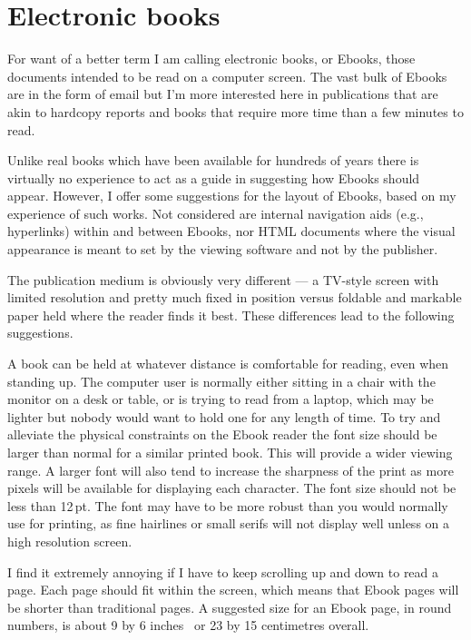 \documentclass[10pt,a4paper,oneside,extrafontsizes]{memoir}%
\newcommand\U[2]{\textrm{#1}\,\textrm{#2}}
\begin{document}

\section{Electronic books}

\begin{paracol}{2}
\switchEng
    For want of a better term I am calling electronic books, or Ebooks, 
those documents intended to be read on a computer screen. The vast bulk
of Ebooks are in the form of email but I'm more interested here in 
publications that are akin to hardcopy reports and books that require
more time than a few minutes to read.

    Unlike real books which have been available for hundreds of years there
is virtually no experience to act as a guide in suggesting how Ebooks should
appear. However, I offer some suggestions for the layout of Ebooks, based on
my experience of such works. 
Not considered are internal navigation aids
(e.g., hyperlinks) within and between Ebooks, nor HTML documents where
the visual appearance is meant to set by the viewing software and not 
by the publisher.

    The publication medium is obviously very different --- a TV-style 
screen with limited resolution and pretty much fixed in position versus
foldable and markable paper held where the reader finds it best.
These differences lead to the following suggestions.

    A book can be held at whatever distance is comfortable for reading, even
when standing up.
The computer user is normally either sitting in a chair with the monitor
on a desk or table, or is trying to read from a laptop, which may be 
lighter but nobody would want to hold one for any length of time. To try
and alleviate the physical constraints on the Ebook reader the font size
should be larger than normal for a similar printed book. This will provide
a wider viewing range. A larger font will also tend to
increase the sharpness of the print as more pixels will be available for
displaying each character.
    The font size should not be less than \U{12}{pt}. The font may have to be
more robust than you would normally use for printing, as fine hairlines 
or small serifs will not display well unless on a high resolution screen.

    I find it extremely annoying if I have to keep scrolling up and down
to read a page. Each page should fit within the screen, which means that
Ebook pages will be shorter than traditional pages. 
A suggested size for an Ebook page, in round numbers, is 
about 9 by 6 inches~\autocite{ADOBEBOOK} or 23 by 15 centimetres overall.


\end{paracol}
\end{document}
